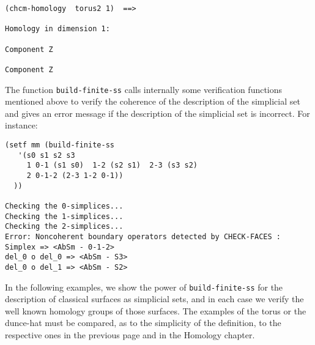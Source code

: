 {\footnotesize\begin{verbatim}
(chcm-homology  torus2 1)  ==>

Homology in dimension 1:

Component Z

Component Z
\end{verbatim}}
The function {\tt build-finite-ss} calls internally some verification functions mentioned above
to verify the coherence of the description of the simplicial set and gives 
an error message if the description of the simplicial set is incorrect. For instance:
{\footnotesize\begin{verbatim}
(setf mm (build-finite-ss 
   '(s0 s1 s2 s3 
     1 0-1 (s1 s0)  1-2 (s2 s1)  2-3 (s3 s2)
     2 0-1-2 (2-3 1-2 0-1))
  ))

Checking the 0-simplices...
Checking the 1-simplices...
Checking the 2-simplices...
Error: Noncoherent boundary operators detected by CHECK-FACES :
Simplex => <AbSm - 0-1-2>
del_0 o del_0 => <AbSm - S3>
del_0 o del_1 => <AbSm - S2>
\end{verbatim}}
\vskip 0.35cm
In the following examples, we show the power of {\tt build-finite-ss} for the description
of classical surfaces as simplicial sets, and in each case we  verify the well known 
homology groups of those surfaces. The examples of the torus
or the dunce-hat must be compared, as to the simplicity of the definition, to the respective 
ones in the previous page and in  the Homology chapter.
\newpage
%
\vskip 0.40cm
\centerline{}
\vskip 0.40cm
%

